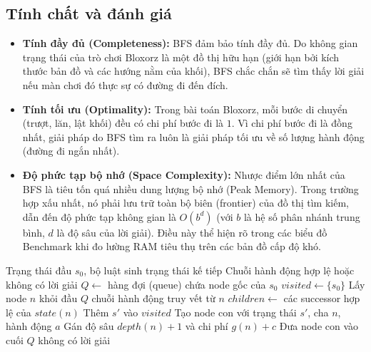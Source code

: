 \subsection{Tính chất và đánh giá}
\begin{itemize}
    \item \textbf{Tính đầy đủ (Completeness):} BFS đảm bảo tính đầy đủ. Do không gian trạng thái của trò chơi Bloxorz là một đồ thị hữu hạn (giới hạn bởi kích thước bản đồ và các hướng nằm của khối), BFS chắc chắn sẽ tìm thấy lời giải nếu màn chơi đó thực sự có đường đi đến đích.
    \item \textbf{Tính tối ưu (Optimality):} Trong bài toán Bloxorz, mỗi bước di chuyển (trượt, lăn, lật khối) đều có chi phí bước đi là $1$. Vì chi phí bước đi là đồng nhất, giải pháp do BFS tìm ra luôn là giải pháp tối ưu về số lượng hành động (đường đi ngắn nhất).
    \item \textbf{Độ phức tạp bộ nhớ (Space Complexity):} Nhược điểm lớn nhất của BFS là tiêu tốn quá nhiều dung lượng bộ nhớ (Peak Memory). Trong trường hợp xấu nhất, nó phải lưu trữ toàn bộ biên (frontier) của đồ thị tìm kiếm, dẫn đến độ phức tạp không gian là $O(b^d)$ (với $b$ là hệ số phân nhánh trung bình, $d$ là độ sâu của lời giải). Điều này thể hiện rõ trong các biểu đồ Benchmark khi đo lường RAM tiêu thụ trên các bản đồ cấp độ khó.
\end{itemize}

\begin{algorithm}[H]
\caption{Thuật toán BFS}
\label{alg:bfs}
\begin{algorithmic}[1]
\Require Trạng thái đầu $s_0$, bộ luật sinh trạng thái kế tiếp
\Ensure Chuỗi hành động hợp lệ hoặc không có lời giải
\State $Q \gets$ hàng đợi (queue) chứa node gốc của $s_0$
\State $visited \gets \{s_0\}$
    \State Lấy node $n$ khỏi đầu $Q$
        \State \Return chuỗi hành động truy vết từ $n$
    \EndIf
    \State $children \gets$ các successor hợp lệ của $state(n)$
            \State Thêm $s'$ vào $visited$
            \State Tạo node con với trạng thái $s'$, cha $n$, hành động $a$
            \State Gán độ sâu $depth(n)+1$ và chi phí $g(n)+c$
            \State Đưa node con vào cuối $Q$
        \EndIf
    \EndFor
\EndWhile
\State \Return không có lời giải
\end{algorithmic}
\end{algorithm}